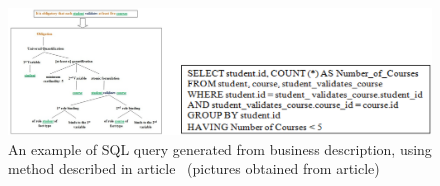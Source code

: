 \begin{figure}[H]
	\centering
	\includegraphics[width=\textwidth]{./images/njonko-example.pdf}
	\caption{An example of SQL query generated from business description, using method described in article~\cite{from-nl-to-model-via-sbvr} (pictures obtained from article)}
	\label{fig:njonko_example}
\end{figure}